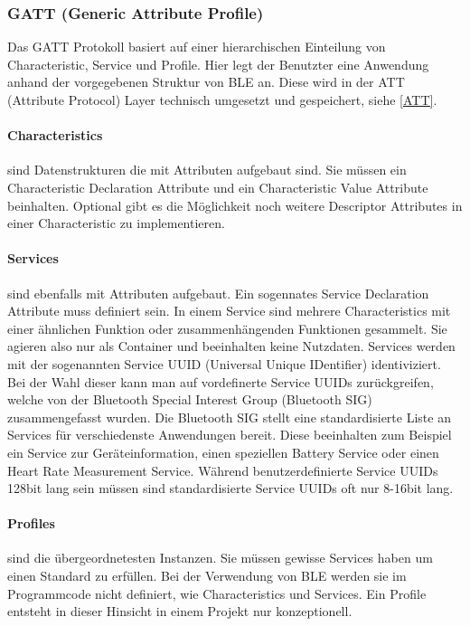 \subsubsection{GATT (Generic Attribute Profile)} \label{GATT}
Das GATT Protokoll basiert auf einer hierarchischen Einteilung von Characteristic, Service und Profile.
Hier legt der Benutzter eine Anwendung anhand der vorgegebenen Struktur von BLE an. Diese wird in der ATT (Attribute Protocol) Layer technisch umgesetzt und gespeichert,
siehe \ref{ATT}.

\noindent
\paragraph{Characteristics} sind Datenstrukturen die mit Attributen aufgebaut sind. Sie müssen ein Characteristic Declaration Attribute und ein Characteristic Value Attribute beinhalten.
Optional gibt es die Möglichkeit noch weitere Descriptor Attributes in einer Characteristic zu implementieren.\cite{espressif_ble_intro}
\noindent
\paragraph{Services} sind ebenfalls mit Attributen aufgebaut. Ein sogennates Service Declaration Attribute muss definiert sein.
In einem Service sind mehrere Characteristics mit einer ähnlichen Funktion oder zusammenhängenden Funktionen gesammelt. Sie agieren also nur als Container und beeinhalten keine Nutzdaten. 
Services werden mit der sogenannten Service UUID (Universal Unique IDentifier) identiviziert. Bei der Wahl dieser kann man auf vordefinerte Service UUIDs zurückgreifen, welche von der Bluetooth Special Interest Group (Bluetooth SIG) zusammengefasst wurden. 
Die Bluetooth SIG stellt eine standardisierte Liste an Services für verschiedenste Anwendungen bereit. Diese beeinhalten zum Beispiel ein Service zur Geräteinformation, einen speziellen Battery Service
oder einen Heart Rate Measurement Service. Während benutzerdefinierte Service UUIDs 128bit lang sein müssen sind standardisierte Service UUIDs oft nur 8-16bit lang. \cite{predefined_serviceUUIDs} \cite{espressif_ble_intro}
\noindent
\paragraph{Profiles} sind die übergeordnetesten Instanzen. Sie müssen gewisse Services haben um einen Standard zu erfüllen. 
Bei der Verwendung von BLE werden sie im Programmcode nicht definiert, wie Characteristics und Services.
Ein Profile entsteht in dieser Hinsicht in einem Projekt nur konzeptionell. \cite{espressif_ble_intro}


